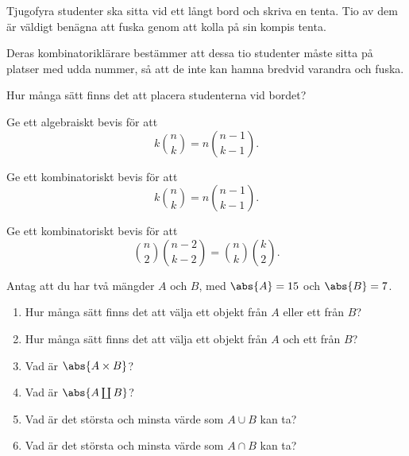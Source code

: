 \documentclass{tufte-handout}
\begin{document}
\begin{xca}
	Tjugofyra studenter ska sitta vid ett långt bord och skriva en tenta. Tio av dem är väldigt benägna att fuska genom att kolla på sin kompis tenta.

	Deras kombinatoriklärare bestämmer att dessa tio studenter måste sitta på platser med udda nummer, så att de inte kan hamna bredvid varandra och fuska.

	Hur många sätt finns det att placera studenterna vid bordet?
\end{xca}

\begin{xca}
	Ge ett algebraiskt bevis för att
	$$k\binom{n}{k} = n \binom{n-1}{k-1}.$$
\end{xca}

\begin{xca}
	Ge ett kombinatoriskt bevis för att
	$$k\binom{n}{k} = n \binom{n-1}{k-1}.$$
\end{xca}

\begin{xca}
	Ge ett kombinatoriskt bevis för att
	$$\binom{n}{2}\binom{n-2}{k-2} = \binom{n}{k}\binom{k}{2}.$$
\end{xca}

\begin{xca}
	Antag att du har två mängder $A$ och $B$, med $\abs{A} = 15$ och $\abs{B} = 7$.
	\begin{enumerate}
		\item Hur många sätt finns det att välja ett objekt från $A$ eller ett från $B$?
		\item Hur många sätt finns det att välja ett objekt från $A$ och ett från $B$?
		\item Vad är $\abs{A\times B}$?
		\item Vad är $\abs{A \coprod B}$?
		\item Vad är det största och minsta värde som $A \cup B$ kan ta?
		\item Vad är det största och minsta värde som $A \cap B$ kan ta?
	\end{enumerate}
\end{xca}
\end{document}
